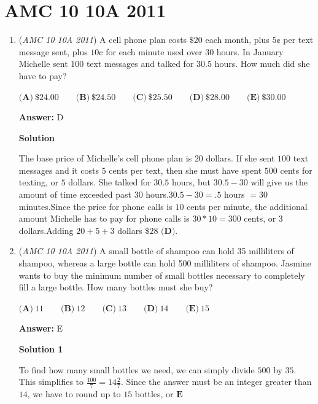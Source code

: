 \section{AMC 10 10A 2011}
        \begin{enumerate}
        	\item (\textit{AMC 10 10A 2011}) A cell phone plan costs $\$20$ each month, plus $5$¢ per text message sent, plus $10$¢ for each minute used over $30$ hours. In January Michelle sent $100$ text messages and talked for $30.5$ hours. How much did she have to pay?


 $\textbf{(A)}\ \$ 24.00 \qquad\textbf{(B)}\ \$ 24.50 \qquad\textbf{(C)}\ \$ 25.50\qquad\textbf{(D)}\ \$ 28.00\qquad\textbf{(E)}\ \$ 30.00$

 \textbf{Answer: }D



\textbf{Solution}

The base price of Michelle's cell phone plan is $20$ dollars. If she sent $100$ text messages and it costs $5$ cents per text, then she must have spent $500$ cents for texting, or $5$ dollars. She talked for $30.5$ hours, but $30.5-30$ will give us the amount of time exceeded past 30 hours.$30.5-30=.5$ hours $=30$ minutes.Since the price for phone calls is $10$ cents per minute, the additional amount Michelle has to pay for phone calls is $30*10=300$ cents, or $3$ dollars.Adding $20+5+3$ dollars $\boxed{\$28 \textbf{ (D)}}$.

 


 


	\item (\textit{AMC 10 10A 2011}) A small bottle of shampoo can hold 35 milliliters of shampoo, whereas a large bottle can hold 500 milliliters of shampoo. Jasmine wants to buy the minimum number of small bottles necessary to completely fill a large bottle. How many bottles must she buy?


 $\textbf{(A)}\ 11 \qquad\textbf{(B)}\ 12 \qquad\textbf{(C)}\ 13\qquad\textbf{(D)}\ 14\qquad\textbf{(E)}\ 15$

 \textbf{Answer: }E



\textbf{Solution 1}

To find how many small bottles we need, we can simply divide $500$ by $35$. This simplifies to $\frac{100}{7}=14 \frac{2}{7}.$ Since the answer must be an integer greater than $14$, we have to round up to $15$ bottles, or $\boxed{\textbf{E}}$





\end{enumerate}
